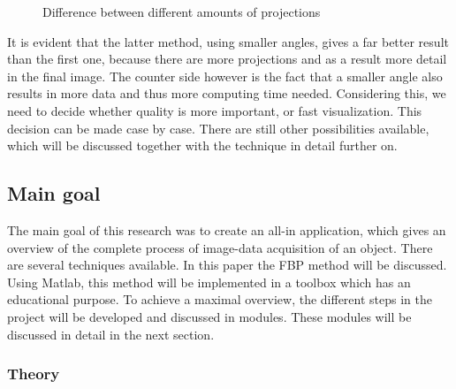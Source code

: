 \documentclass[9pt,journal,compsoc,twoside, a4paper]{elab}
\begin{document}
\begin{figure}[hbt]
	\centering
		\caption{Difference between different amounts of projections}
	\label{fig:Projections}
\end{figure}
It is evident that the latter method, using smaller angles, gives a far better result than the first one, because there are more projections and as a result more detail in the final image. The counter side however is the fact that a smaller angle also results in more data and thus more computing time needed. Considering this, we need to decide whether quality is more important, or fast visualization. This decision can be made case by case. There are still other possibilities available, which will be discussed together with the technique in detail further on. 

\subsection{Main goal}
The main goal of this research was to create an all-in application, which gives an overview of the complete process of image-data acquisition of an object. There are several techniques available. In this paper the FBP method will be discussed. Using Matlab, this method will be implemented in a toolbox which has an educational purpose. To achieve a maximal overview, the different steps in the project will be developed and discussed in modules.  These modules will be discussed in detail in the next section.


\subsubsection{Theory}
\end{document}
